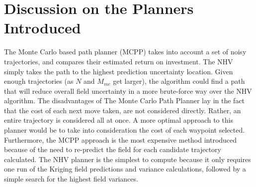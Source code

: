 \section{Discussion on the Planners Introduced}
The Monte Carlo based path planner (MCPP) takes into account a set of noisy trajectories, and compares their estimated return on investment. The NHV simply takes the path to the highest prediction uncertainty location. Given enough trajectories (as $N$ and $M_{mc}$ get larger), the algorithm could find a path that will reduce overall field uncertainty in a more brute-force way over the NHV algorithm. The disadvantages of The Monte Carlo Path Planner lay in the fact that the cost of each next move taken, are not considered directly. Rather, an entire trajectory is considered all at once. A more optimal approach to this planner would be to take into consideration the cost of each waypoint selected. Furthermore, the MCPP approach is the most expensive method introduced because of the need to re-predict the field for each candidate trajectory calculated. The NHV planner is the simplest to compute because it only requires one run of the Kriging field predictions and variance calculations, followed by a simple search for the highest field variances.
